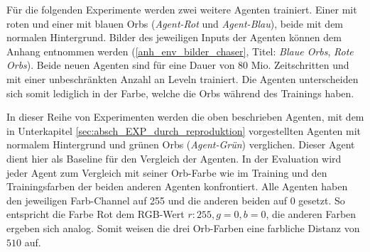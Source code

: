 Für die folgenden Experimente werden zwei weitere Agenten trainiert. Einer mit roten und einer mit blauen Orbs (\emph{Agent-Rot} und \emph{Agent-Blau}), beide mit dem normalen Hintergrund. Bilder des jeweiligen Inputs der Agenten können dem Anhang entnommen werden (\ref{anh_env_bilder_chaser}, Titel: \emph{Blaue Orbs}, \emph{Rote Orbs}). Beide neuen Agenten sind für eine Dauer von 80 Mio. Zeitschritten und mit einer unbeschränkten Anzahl an Leveln trainiert. Die Agenten unterscheiden sich somit lediglich in der Farbe, welche die Orbs während des Trainings haben. 

In dieser Reihe von Experimenten werden die oben beschrieben Agenten, mit dem in Unterkapitel \ref{sec:absch_EXP_durch_reproduktion} vorgestellten Agenten mit normalem Hintergrund und grünen Orbs (\emph{Agent-Grün}) verglichen. Dieser Agent dient hier als Baseline für den Vergleich der Agenten. In der Evaluation wird jeder Agent zum Vergleich mit seiner Orb-Farbe wie im Training und den Trainingsfarben der beiden anderen Agenten konfrontiert. Alle Agenten haben den jeweiligen Farb-Channel auf 255 und die anderen beiden auf 0 gesetzt. So entspricht die Farbe Rot dem RGB-Wert $ r:255, g=0, b=0 $, die anderen Farben ergeben sich analog. Somit weisen die drei Orb-Farben eine farbliche Distanz von $510$ auf.

